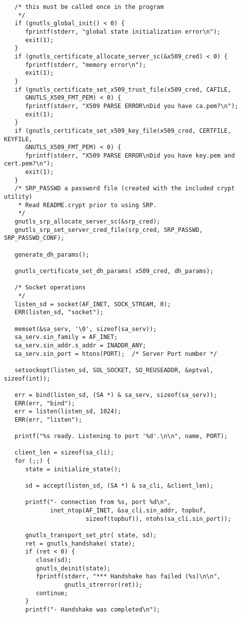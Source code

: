 \begin{verbatim}
   /* this must be called once in the program
    */
   if (gnutls_global_init() < 0) {
      fprintf(stderr, "global state initialization error\n");
      exit(1);
   }
   if (gnutls_certificate_allocate_server_sc(&x509_cred) < 0) {
      fprintf(stderr, "memory error\n");
      exit(1);
   }
   if (gnutls_certificate_set_x509_trust_file(x509_cred, CAFILE, 
      GNUTLS_X509_FMT_PEM) < 0) {
      fprintf(stderr, "X509 PARSE ERROR\nDid you have ca.pem?\n");
      exit(1);
   }
   if (gnutls_certificate_set_x509_key_file(x509_cred, CERTFILE, KEYFILE, 
      GNUTLS_X509_FMT_PEM) < 0) {
      fprintf(stderr, "X509 PARSE ERROR\nDid you have key.pem and cert.pem?\n");
      exit(1);
   }
   /* SRP_PASSWD a password file (created with the included crypt utility) 
    * Read README.crypt prior to using SRP.
    */
   gnutls_srp_allocate_server_sc(&srp_cred);
   gnutls_srp_set_server_cred_file(srp_cred, SRP_PASSWD, SRP_PASSWD_CONF);

   generate_dh_params();
   
   gnutls_certificate_set_dh_params( x509_cred, dh_params);

   /* Socket operations
    */
   listen_sd = socket(AF_INET, SOCK_STREAM, 0);
   ERR(listen_sd, "socket");

   memset(&sa_serv, '\0', sizeof(sa_serv));
   sa_serv.sin_family = AF_INET;
   sa_serv.sin_addr.s_addr = INADDR_ANY;
   sa_serv.sin_port = htons(PORT);  /* Server Port number */

   setsockopt(listen_sd, SOL_SOCKET, SO_REUSEADDR, &optval, sizeof(int));

   err = bind(listen_sd, (SA *) & sa_serv, sizeof(sa_serv));
   ERR(err, "bind");
   err = listen(listen_sd, 1024);
   ERR(err, "listen");

   printf("%s ready. Listening to port '%d'.\n\n", name, PORT);

   client_len = sizeof(sa_cli);
   for (;;) {
      state = initialize_state();

      sd = accept(listen_sd, (SA *) & sa_cli, &client_len);

      printf("- connection from %s, port %d\n",
             inet_ntop(AF_INET, &sa_cli.sin_addr, topbuf,
                       sizeof(topbuf)), ntohs(sa_cli.sin_port));

      gnutls_transport_set_ptr( state, sd);
      ret = gnutls_handshake( state);
      if (ret < 0) {
         close(sd);
         gnutls_deinit(state);
         fprintf(stderr, "*** Handshake has failed (%s)\n\n",
                 gnutls_strerror(ret));
         continue;
      }
      printf("- Handshake was completed\n");


\end{verbatim}
